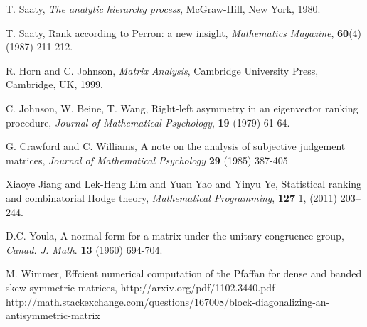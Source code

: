 \documentclass[a4,11pt,twoside,leqno]{report}
\theoremstyle{definition}
\theoremstyle{remark}
\numberwithin{equation}{section}
\begin{document}
\begin{thebibliography}{1}

   T. Saaty, {\em The analytic hierarchy process}, McGraw-Hill, New York, 1980. 
  
   T. Saaty, Rank according to Perron: a new insight, {\em Mathematics Magazine}, {\bf 60}(4) (1987) 211-212.

   R. Horn and C. Johnson, {\em Matrix Analysis}, Cambridge University Press, Cambridge, UK, 1999.

   C. Johnson, W. Beine, T. Wang, Right-left asymmetry in an eigenvector ranking procedure, {\em Journal of Mathematical Psychology}, {\bf 19} (1979) 61-64.
  
   G. Crawford and C. Williams, A note on the analysis of subjective judgement matrices, {\em Journal of Mathematical Psychology} {\bf 29} (1985) 387-405
  
   Xiaoye Jiang and Lek-Heng Lim and Yuan Yao and
Yinyu Ye, Statistical ranking and combinatorial Hodge theory, \emph{Mathematical
Programming}, \textbf{127} 1, (2011) 203--244. 

 D.C. Youla, A normal form for a matrix under the unitary congruence group, {\em Canad. J. Math}. {\bf 13} (1960) 694-704.

 M. Wimmer, Effcient numerical computation of the Pfaffan for dense and banded skew-symmetric matrices, http://arxiv.org/pdf/1102.3440.pdf
 http://math.stackexchange.com/questions/167008/block-diagonalizing-an-antisymmetric-matrix
 
  
  
  
   
  




  \end{thebibliography}
\end{document}
